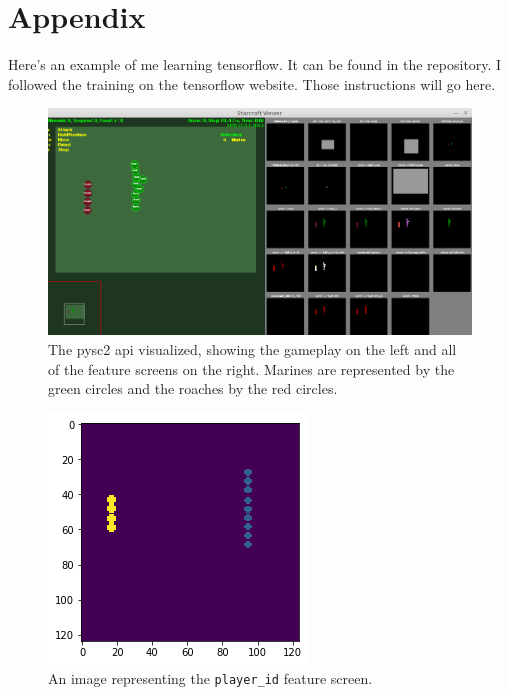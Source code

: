 \documentclass{amsart}
\theoremstyle{definition}
\begin{document}
\section{Appendix}


Here's an example of me learning tensorflow.
It can be found in the repository.
I followed the training on the tensorflow website.
Those instructions will go here.


\begin{figure}[h!]
    \includegraphics[width=1.0\linewidth]{gameplay}
    \caption{The pysc2 api visualized, showing the gameplay on the left and all of the feature screens on the right. Marines are represented by the green circles and the roaches by the red circles.}
\end{figure}


\begin{figure}[h!]
    \includegraphics[width=1.0\linewidth]{fine}
    \caption{An image representing the {\tt player\_id} feature screen.}
\end{figure}
\end{document}
